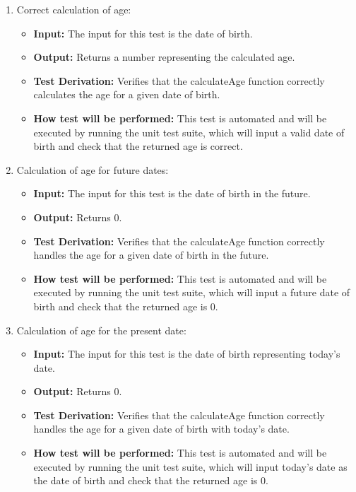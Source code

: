 \documentclass[12pt, titlepage]{article}
\begin{document}
\begin{enumerate}
  \item Correct calculation of age:
    \begin{itemize}
      \item \textbf{Input:} The input for this test is the date of birth.    
      \item \textbf{Output:} Returns a number representing the calculated age.
      \item \textbf{Test Derivation:} Verifies that the calculateAge function correctly calculates the age for a given date of birth.
      \item \textbf{How test will be performed:} This test is automated and will be executed by running the unit test suite, which will input a valid date of birth and check that the returned age is correct.
    \end{itemize}

  \item Calculation of age for future dates:
    \begin{itemize}
      \item \textbf{Input:} The input for this test is the date of birth in the future.    
      \item \textbf{Output:} Returns 0.
      \item \textbf{Test Derivation:} Verifies that the calculateAge function correctly handles the age for a given date of birth in the future.
      \item \textbf{How test will be performed:} This test is automated and will be executed by running the unit test suite, which will input a future date of birth and check that the returned age is 0.
    \end{itemize}

  \item Calculation of age for the present date:
    \begin{itemize}
      \item \textbf{Input:} The input for this test is the date of birth representing today's date.    
      \item \textbf{Output:} Returns 0.
      \item \textbf{Test Derivation:} Verifies that the calculateAge function correctly handles the age for a given date of birth with today's date.
      \item \textbf{How test will be performed:} This test is automated and will be executed by running the unit test suite, which will input today's date as the date of birth and check that the returned age is 0.
    \end{itemize}
\end{enumerate}
\end{document}
